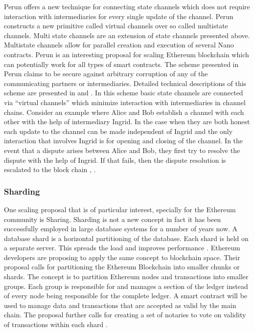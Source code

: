 Perun offers a new technique for connecting state channels which does not require interaction with intermediaries for every single update of the channel. Perun constructs a new primitive called virtual channels over so called multistate channels. Multi state channels are an extension of state channels presented above. Multistate channels allow for parallel creation and execution of several Nano contracts. Perun is an interesting proposal for scaling Ethereum blockchain which can potentially work for all types of smart contracts. The scheme presented in Perun claims to be secure against arbitrary corruption of any of the communicating partners or intermediaries. Detailed technical descriptions of this scheme are presented in \cite{cryptoeprint:2018:320} and \cite{cryptoeprint:2017:635}. In this scheme basic state channels are connected via “virtual channels” which minimize interaction with intermediaries in channel chains. Consider an example where Alice and Bob establish a channel with each other with the help of intermediary Ingrid. In the case when they are both honest each update to the channel can be made independent of Ingrid and the only interaction that involves Ingrid is for opening and closing of the channel. In the event that a dispute arises between Alice and Bob, they first try to resolve the dispute with the help of Ingrid. If that fails, then the dispute resolution is escalated to the block chain \cite{cryptoeprint:2018:320}, \cite{cryptoeprint:2017:635}.

\subsubsection{Sharding}
One scaling proposal that is of particular interest, specially for the Ethereum community is Sharing. Sharding is not a new concept in fact it has been successfully employed in large database systems for a number of years now. A database shard is a horizontal partitioning of the database. Each shard is held on a separate server. This spreads the load and improves performance \cite{Corbett:2012:SGG:2387880.2387905}. Ethereum developers are proposing to apply the same concept to blockchain space. Their proposal calls for partitioning the Ethereum Blockchain into smaller chunks or shards. The concept is to partition Ethereum nodes and transactions into smaller groups. Each group is responsible for and manages a section of the ledger instead of every node being responsible for the complete ledger. A smart contract will be used to manage data and transactions that are accepted as valid by the main chain. The proposal further calls for creating a set of notaries to vote on validity of transactions within each shard \cite{eth:009}. 
\vspace{0.5cm}  
